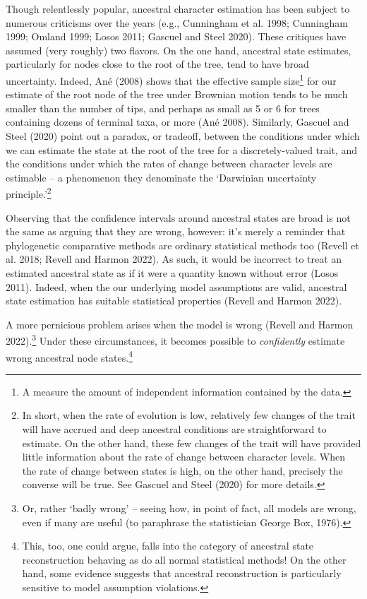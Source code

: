 \documentclass{article}
\begin{document}
Though relentlessly popular, ancestral character estimation has been subject to numerous criticisms over the years (e.g., Cunningham et al. 1998; Cunningham 1999; Omland 1999; Losos 2011; Gascuel and Steel 2020). These critiques have assumed (very roughly) two flavors. On the one hand, ancestral state estimates, particularly for nodes close to the root of the tree, tend to have broad uncertainty. Indeed, Ané (2008) shows that the effective sample size\footnote{A measure the amount of independent information contained by the data.} for our estimate of the root node of the tree under Brownian motion tends to be much smaller than the number of tips, and perhaps as small as 5 or 6 for trees containing dozens of terminal taxa, or more (Ané 2008). Similarly, Gascuel and Steel (2020) point out a paradox, or tradeoff, between the conditions under which we can estimate the state at the root of the tree for a discretely-valued trait, and the conditions under which the rates of change between character levels are estimable -- a phenomenon they denominate the `Darwinian uncertainty principle.'\footnote{In short, when the rate of evolution is low, relatively few changes of the trait will have accrued and deep ancestral conditions are straightforward to estimate. On the other hand, these few changes of the trait will have provided little information about the rate of change between character levels. When the rate of change between states is high, on the other hand, precisely the converse will be true. See Gascuel and Steel (2020) for more details.}

Observing that the confidence intervals around ancestral states are broad is not the same as arguing that they are wrong, however: it's merely a reminder that phylogenetic comparative methods are ordinary statistical methods too (Revell et al. 2018; Revell and Harmon 2022). As such, it would be incorrect to treat an estimated ancestral state as if it were a quantity known without error (Losos 2011). Indeed, when the our underlying model assumptions are valid, ancestral state estimation has suitable statistical properties (Revell and Harmon 2022).

A more pernicious problem arises when the model is wrong (Revell and Harmon 2022).\footnote{Or, rather `badly wrong' -- seeing how, in point of fact, all models are wrong, even if many are useful (to paraphrase the statistician George Box, 1976).} Under these circumstances, it becomes possible to \emph{confidently} estimate wrong ancestral node states.\footnote{This, too, one could argue, falls into the category of ancestral state reconstruction behaving as do all normal statistical methods! On the other hand, some evidence suggests that ancestral reconstruction is particularly sensitive to model assumption violations.}
\end{document}
